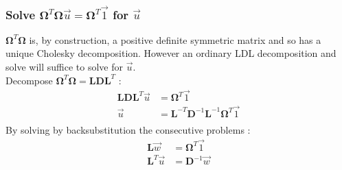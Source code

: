 \documentclass{article}
\def\mat#1{\mathbf{#1}}
\begin{document}
\subsubsection{Solve $\mat{\Omega}^T \mat{\Omega} \vec{u} = \mat{\Omega}^T \vec{1}$ for $\vec{u}$}
$\mat{\Omega}^T\mat{\Omega}$ is, by construction, a positive definite symmetric
matrix and so has a unique Cholesky decomposition. However an ordinary LDL
decomposition and solve will suffice to solve for $\vec{u}$.\\
Decompose $\mat{\Omega}^T \mat{\Omega} = \mat{L}\mat{D}\mat{L}^T $ :
\begin{equation}
\begin{split}
\mat{L}\mat{D}\mat{L}^T \vec{u} &= \mat{\Omega}^T \vec{1}\\
\vec{u} &= \mat{L}^{-T}\mat{D}^{-1}\mat{L}^{-1}\mat{\Omega}^T \vec{1}\\
\end{split}
\end{equation}
By solving by backsubstitution the consecutive problems :
\begin{equation}
\begin{split}
\mat{L}\vec{w} &= \mat{\Omega}^T \vec{1}\\
\mat{L}^T\vec{u} &= \mat{D}^{-1} \vec{w}\\
\end{split}
\end{equation}
\end{document}
